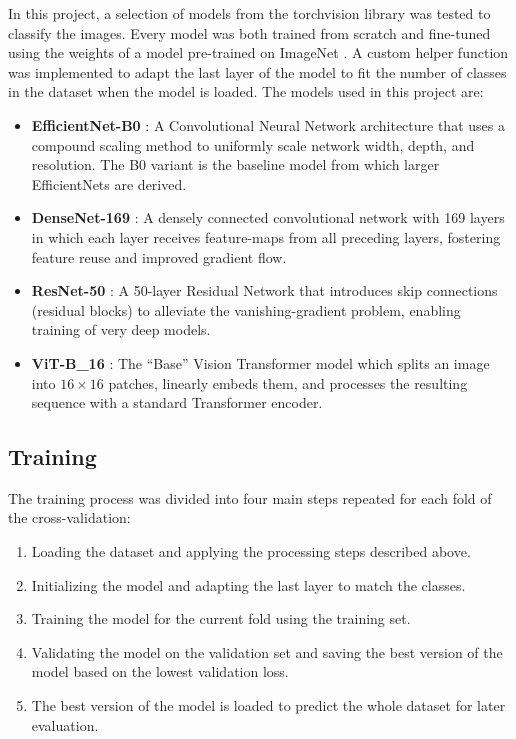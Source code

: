     In this project, a selection of models from the torchvision library was tested to classify the images. 
    Every model was both trained from scratch and fine-tuned using the weights of a model pre-trained on ImageNet \autocite{dengImageNetLargescaleHierarchical2009}.
    A custom helper function was implemented to adapt the last layer of the model to fit the number of classes in the dataset when the model is loaded.
    The models used in this project are:

    \begin{itemize}
        \item \textbf{EfficientNet-B0} \autocite{tanEfficientNetRethinkingModel2019}:  
        A Convolutional Neural Network architecture that uses a compound scaling method to uniformly scale network width, depth, and resolution.  
        The B0 variant is the baseline model from which larger EfficientNets are derived.  

        \item \textbf{DenseNet-169} \autocite{huangDenselyConnectedConvolutional2017}:  
        A densely connected convolutional network with 169 layers in which each layer receives feature-maps from all preceding layers, fostering feature reuse and improved gradient flow.  

        \item \textbf{ResNet-50} \autocite{heDeepResidualLearning2016}:  
        A 50-layer Residual Network that introduces skip connections (residual blocks) to alleviate the vanishing-gradient problem, enabling training of very deep models.  

        \item \textbf{ViT-B\_16} \autocite{dosovitskiyImageWorth16x162021}:  
        The “Base” Vision Transformer model which splits an image into \(16\times 16\) patches, linearly embeds them, and processes the resulting sequence with a standard Transformer encoder.  
    \end{itemize}

    \subsection{Training}

    The training process was divided into four main steps repeated for each fold of the cross-validation:
    \begin{enumerate}
        \item Loading the dataset and applying the processing steps described above.
        \item Initializing the model and adapting the last layer to match the classes.
        \item Training the model for the current fold using the training set.
        \item Validating the model on the validation set and saving the best version of the model based on the lowest validation loss.
        \item The best version of the model is loaded to predict the whole dataset for later evaluation.
    \end{enumerate}

